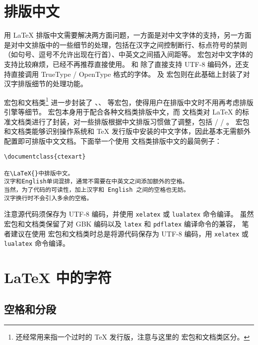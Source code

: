 \section{排版中文}\label{sec:chinese}

用 \LaTeX{} 排版中文需要解决两方面问题，一方面是对中文字体的支持，另一方面是对中文排版中的一些细节的处理，包括在汉字之间控制断行、标点符号的禁则（如句号、逗号不允许出现在行首）、中英文之间插入间距等。 宏包对中文字体的支持比较麻烦，已经不再推荐直接使用。
 和  除了直接支持 UTF-8 编码外，还支持直接调用 TrueType / OpenType 格式的字体。 及  宏包则在此基础上封装了对汉字排版细节的处理功能。

 宏包和文档类\footnote{ 还经常用来指一个过时的 \TeX{} 发行版，注意与这里的  宏包和文档类区分。}%
进一步封装了 、、 等宏包，使得用户在排版中文时不用再考虑排版引擎等细节。 宏包本身用于配合各种文档类排版中文，而  文档类对 \LaTeX{} 的标准文档类进行了封装，对一些排版根据中文排版习惯做了调整，包括  /  / 。
 宏包和文档类能够识别操作系统和 \TeX{} 发行版中安装的中文字体，因此基本无需额外配置即可排版中文文档。下面举一个使用  文档类排版中文的最简例子：

\begin{verbatim}
\documentclass{ctexart}

在\LaTeX{}中排版中文。
汉字和English单词混排，通常不需要在中英文之间添加额外的空格。
当然，为了代码的可读性，加上汉字和 English 之间的空格也无妨。
汉字换行时不会引入多余的空格。

\end{verbatim}

注意源代码须保存为 UTF-8 编码，并使用 \texttt{xelatex} 或 \texttt{lualatex} 命令编译。
虽然  宏包和文档类保留了对 GBK 编码以及 \texttt{latex} 和 \texttt{pdflatex} 编译命令的兼容，
笔者建议在使用  宏包和文档类时总是将源代码保存为 UTF-8 编码，用 \texttt{xelatex} 或 \texttt{lualatex} 命令编译。

\section{\LaTeX{} 中的字符}\label{sec:text-symbols}

\subsection{空格和分段}\label{subsec:spaces}

